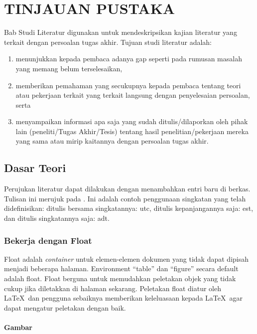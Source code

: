\chapter{TINJAUAN PUSTAKA}

Bab Studi Literatur digunakan untuk mendeskripsikan kajian literatur yang terkait dengan persoalan tugas akhir. Tujuan studi literatur adalah:

\begin{enumerate}
    \item menunjukkan kepada pembaca adanya gap seperti pada rumusan masalah yang memang belum terselesaikan,
    \item memberikan pemahaman yang secukupnya kepada pembaca tentang teori atau pekerjaan terkait yang terkait langsung dengan penyelesaian persoalan, serta
    \item menyampaikan informasi apa saja yang sudah ditulis/dilaporkan oleh pihak lain (peneliti/Tugas Akhir/Tesis) tentang hasil penelitian/pekerjaan mereka yang sama atau mirip kaitannya dengan persoalan tugas akhir.
\end{enumerate}

\section{Dasar Teori}
Perujukan literatur dapat dilakukan dengan menambahkan entri baru di berkas. Tulisan ini merujuk pada \parencite{knuth2001art}. Ini adalah contoh penggunaan singkatan yang telah didefinisikan: ditulis bersama singkatannya: \acrfull{utc}, ditulis kepanjangannya saja: \acrlong{est}, dan ditulis singkatannya saja: \acrshort{adt}.

    \subsection{Bekerja dengan Float}

    Float adalah \textit{container} untuk elemen-elemen dokumen yang tidak dapat dipisah menjadi beberapa halaman. Environment ``table'' dan ``figure'' secara default adalah float. Float berguna untuk memudahkan peletakan objek yang tidak cukup jika diletakkan di halaman sekarang. Peletakan float diatur oleh \LaTeX\ dan pengguna sebaiknya memberikan keleluasaan kepada \LaTeX\ agar dapat mengatur peletakan dengan baik. 
    
    \subsubsection{Gambar}
    
